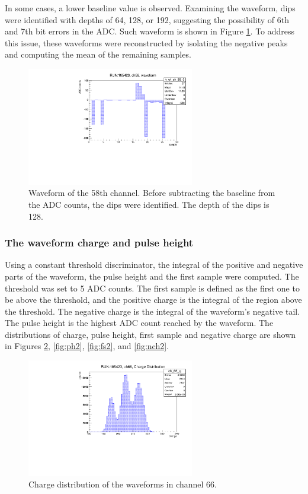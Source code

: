 In some cases, a lower baseline value is observed. Examining the waveform, dips were identified with depths of 64, 128, or 192, 
suggesting the possibility of 6th and 7th bit errors in the ADC. Such waveform is shown in Figure \ref{fig:dips}. 
To address this issue, these waveforms were reconstructed by isolating the negative peaks and computing the mean of the remaining samples.
\begin{figure}[!h]
  \centering
  \includegraphics[width=0.65\textwidth]{figures/pdf/wf_ch58_1.pdf}
  \caption{Waveform of the 58th channel. Before subtracting the baseline from the ADC counts, the dips were identified. The depth of the dips is 128.}
 \label{fig:dips}
\end{figure}
\subsubsection{The waveform charge and pulse height}\label{threshold}
Using a constant threshold discriminator, the integral of the positive and negative parts of the waveform, 
the pulse height and the first sample were computed. The threshold was set to 5 ADC counts. 
The first sample is defined as the first one to be above the threshold, and the positive charge 
is the integral of the region above the threshold. The negative charge is the integral of the waveform's 
negative tail. The pulse height is the highest ADC count reached by the waveform. The distributions of 
charge, pulse height, first sample and negative charge are shown in Figures \ref{fig:ch1}, \ref{fig:ph2}, \ref{fig:fs2}, and \ref{fig:nch2}.

\begin{figure}[!h]
      \centering
      \includegraphics[width=0.65\textwidth]{figures/pdf/charge.pdf}
      \caption{Charge distribution of the waveforms in channel 66.}
      \label{fig:ch1}
  \end{figure}

